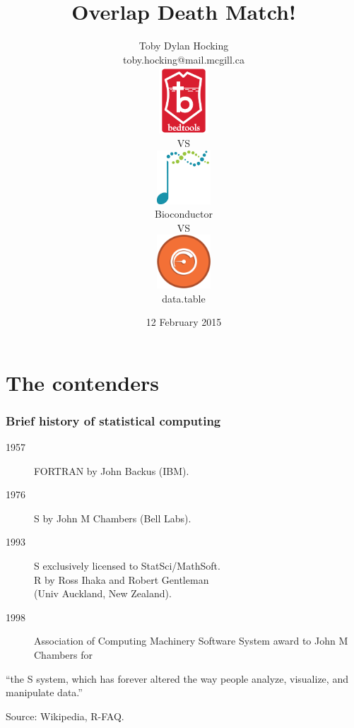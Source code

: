 \documentclass{beamer}
\begin{document}
\title{Overlap Death Match!}

\author{
  Toby Dylan Hocking\\
  toby.hocking@mail.mcgill.ca
\vskip 0.5cm
\parbox{2cm}{
  \includegraphics[height=2.5cm]{bedtools} 
}
VS 
\parbox{2cm}{
  \centering
  \includegraphics[height=2cm]{bioconductor}
  \\
  Bioconductor
}
VS
\parbox{2cm}{
  \centering
  \includegraphics[height=2cm]{datatable} 
  \\
  data.table
}
}

\date{12 February 2015}

\maketitle


\section{The contenders}

\begin{frame}
  \frametitle{Brief history of statistical computing}
  \begin{description}
  \item[1957] FORTRAN by John Backus (IBM).
  \item[1976] S by John M Chambers (Bell Labs).
  \item[1993] S exclusively licensed to StatSci/MathSoft.\\
    R by Ross Ihaka and Robert Gentleman\\
    (Univ Auckland, New Zealand).
  \item[1998] Association of Computing Machinery 
    Software System award
    to John M Chambers for
  \end{description}
  ``the S system, which has forever altered the way people analyze,
  visualize, and manipulate data.''
  
  \vskip 0.5cm Source: Wikipedia, R-FAQ.
\end{frame}
\end{document}
